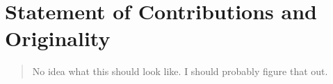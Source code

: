 \chapter*{\centering \LARGE Statement of Contributions and Originality}
\begin{quotation}
\noindent

No idea what this should look like. I should probably figure that out.

\end{quotation}
\clearpage
